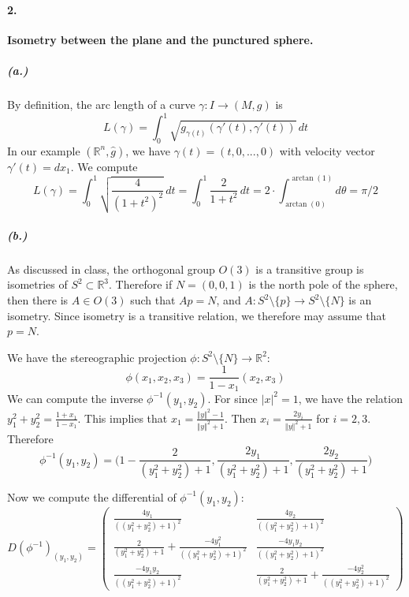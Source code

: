 \documentclass[10pt,letter]{article}
\begin{document}
\paragraph*{2.} \textbf{Isometry between the plane and the punctured sphere. } 
\subparagraph*{(a.)} By definition, the arc length of a curve $\gamma: I \rightarrow (M,g)$ is
\begin{equation*}
L(\gamma) = \int_{0}^1 \sqrt{g_{\gamma(t)}(\gamma'(t),\gamma'(t))} \, dt
\end{equation*}
In our example $(\mathbb{R}^n,\hat{g})$, we have $\gamma(t) = (t,0,...,0)$ with velocity vector $\gamma'(t) = dx_1$. We compute
\begin{dmath*}
L(\gamma) = \int_{0}^1 \sqrt{\frac{4}{(1+t^2)^2}} \, dt 
=  \int_{0}^1 \frac{2}{1+t^2} \, dt
= 2 \cdot \int_{\arctan(0)}^{\arctan(1)} d \theta
= \pi/2
\end{dmath*}

\subparagraph*{(b.)} As discussed in class, the orthogonal group $O(3)$ is a transitive group is isometries of $S^2 \subset \mathbb{R}^3$. Therefore if $N = (0,0,1)$ is the north pole of the sphere, then there is $A \in O(3)$ such that $Ap = N$, and $A: S^2 \setminus \lbrace p \rbrace \rightarrow S^2 \setminus \lbrace N \rbrace$ is an isometry. Since isometry is a transitive relation, we therefore may assume that $p = N$. 

We have the stereographic projection $\phi: S^2 \setminus \lbrace N \rbrace \rightarrow \mathbb{R}^2$:
\begin{equation*}
\phi(x_1,x_2,x_3) = \frac{1}{1-x_1}(x_2,x_3)
\end{equation*}
We can compute the inverse $\phi^{-1}(y_1,y_2)$. For since $\vert x \vert^2 = 1$, we have the relation $y_1^2 + y_2^2 = \frac{1+x_1}{1-x_1}$. This implies that $x_1 =\frac{ \Vert y \Vert^2 - 1}{\Vert y \Vert^2 + 1}$. Then $x_i = \frac{2 y_i}{\Vert y \Vert^2 + 1}$ for $i = 2,3$. Therefore 
\begin{equation*}
\phi^{-1}(y_1,y_2) = \bigg(1-\frac{2}{(y_1^2 + y_2^2) + 1},\frac{2y_1}{(y_1^2 + y_2^2) + 1},\frac{2y_2}{(y_1^2 + y_2^2) + 1} \bigg)
\end{equation*}

Now we compute the differential of $\phi^{-1}(y_1,y_2)$:
\begin{equation*}
D(\phi^{-1})_{(y_1,y_2)} = 
\left(
\begin{array}{cc}
\frac{4y_1}{((y_1^2 + y_2^2) + 1)^2} & \frac{4y_2}{((y_1^2 + y_2^2) + 1)^2}  \\ 
\frac{2}{(y_1^2 + y_2^2) + 1} + \frac{-4y_1^2}{((y_1^2 + y_2^2) + 1)^2} &  \frac{-4y_1y_2}{((y_1^2 + y_2^2) + 1)^2} \\
\frac{-4y_1y_2}{((y_1^2 + y_2^2) + 1)^2} & \frac{2}{(y_1^2 + y_2^2) + 1} + \frac{-4y_2^2}{((y_1^2 + y_2^2) + 1)^2} 
\end{array}
\right)
\end{equation*}
\end{document}
